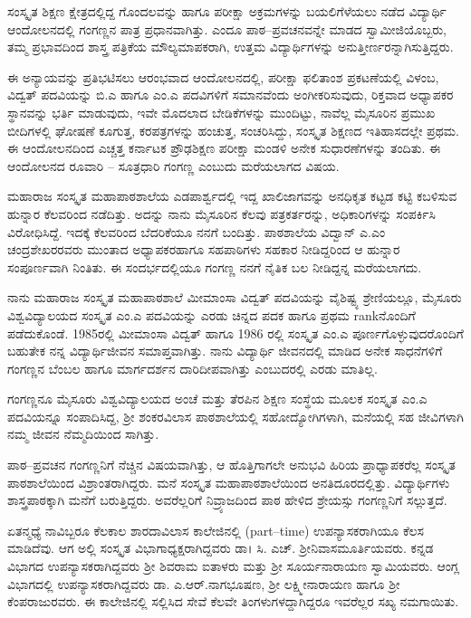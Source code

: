 ಸಂಸ್ಕೃತ ಶಿಕ್ಷಣ ಕ್ಷೇತ್ರದಲ್ಲಿದ್ದ ಗೊಂದಲವನ್ನು ಹಾಗೂ ಪರೀಕ್ಷಾ ಅಕ್ರಮಗಳನ್ನು ಬಯಲಿಗೆಳೆಯಲು ನಡೆದ ವಿದ್ಯಾರ್ಥಿ ಆಂದೋಲನದಲ್ಲಿ ಗಂಗಣ್ಣನ ಪಾತ್ರ ಪ್ರಧಾನವಾಗಿತ್ತು. ಎಂದೂ ಪಾಠ–ಪ್ರವಚನವನ್ನೇ ಮಾಡದ ಸ್ವಾಮೀಜಿಯೊಬ್ಬರು, ತಮ್ಮ  ಪ್ರಭಾವದಿಂದ ಶಾಸ್ತ್ರ ಪತ್ರಿಕೆಯ ಮೌಲ್ಯಮಾಪಕರಾಗಿ, ಉತ್ತಮ ವಿದ್ಯಾರ್ಥಿಗಳನ್ನು ಅನುತ್ತೀರ್ಣರನ್ನಾಗಿಸುತ್ತಿದ್ದರು. 

ಈ ಅನ್ಯಾಯವನ್ನು ಪ್ರತಿಭಟಿಸಲು ಆರಂಭವಾದ ಆಂದೋಲನದಲ್ಲಿ, ಪರೀಕ್ಷಾ ಫಲಿತಾಂಶ ಪ್ರಕಟಣೆಯಲ್ಲಿ ವಿಳಂಬ, ವಿದ್ವತ್ ಪದವಿಯನ್ನು ಬಿ.ಎ  ಹಾಗೂ  ಎಂ.ಎ ಪದವಿಗಳಿಗೆ ಸಮಾನವೆಂದು ಅಂಗೀಕರಿಸುವುದು, ರಿಕ್ತವಾದ ಅಧ್ಯಾಪಕರ ಸ್ಥಾನವನ್ನು  ಭರ್ತಿ ಮಾಡುವುದು, ಇವೇ ಮೊದಲಾದ ಬೇಡಿಕೆಗಳನ್ನು ಮುಂದಿಟ್ಟು, ನಾವೆಲ್ಲ ಮೈಸೂರಿನ ಪ್ರಮುಖ ಬೀದಿಗಳಲ್ಲಿ ಘೋಷಣೆ ಕೂಗುತ್ತ, ಕರಪತ್ರಗಳನ್ನು ಹಂಚುತ್ತ, ಸಂಚರಿಸಿದ್ದು, ಸಂಸ್ಕೃತ ಶಿಕ್ಷಣದ ಇತಿಹಾಸದಲ್ಲೇ ಪ್ರಥಮ. ಈ ಆಂದೋಲನದಿಂದ ಎಚ್ಚತ್ತ ಕರ್ನಾಟಕ ಪ್ರೌಢಶಿಕ್ಷಣ ಪರೀಕ್ಷಾ ಮಂಡಳಿ ಅನೇಕ ಸುಧಾರಣೆಗಳನ್ನು ತಂದಿತು. ಈ ಆಂದೋಲನದ ರೂವಾರಿ – ಸೂತ್ರಧಾರಿ ಗಂಗಣ್ಣ  ಎಂಬುದು ಮರೆಯಲಾಗದ ವಿಷಯ.

ಮಹಾರಾಜ ಸಂಸ್ಕೃತ ಮಹಾಪಾಠಶಾಲೆಯ ಎಡಪಾರ್ಶ್ವದಲ್ಲಿ ಇದ್ದ ಖಾಲಿಜಾಗವನ್ನು ಅನಧಿಕೃತ ಕಟ್ಟಡ ಕಟ್ಟಿ ಕಬಳಿಸುವ ಹುನ್ನಾರ ಕೆಲವರಿಂದ ನಡೆದಿತ್ತು. ಅದನ್ನು ನಾನು ಮೈಸೂರಿನ ಕೆಲವು  ಪತ್ರಕರ್ತರನ್ನು, ಅಧಿಕಾರಿಗಳನ್ನು ಸಂಪರ್ಕಿಸಿ ವಿರೋಧಿಸಿದ್ದೆ. ಇದಕ್ಕೆ ಕೆಲವರಿಂದ ಬೆದರಿಕೆಯೂ ನನಗೆ ಬಂದಿತ್ತು. ಪಾಠಶಾಲೆಯ ವಿದ್ವಾನ್ ಎ.ಎಂ ಚಂದ್ರಶೇಖರರವರು ಮುಂತಾದ ಅಧ್ಯಾಪಕರಹಾಗೂ ಸಹಪಾಠಿಗಳು ಸಹಕಾರ ನೀಡಿದ್ದರಿಂದ ಆ ಹುನ್ನಾರ ಸಂಪೂರ್ಣವಾಗಿ ನಿಂತಿತು. ಈ ಸಂದರ್ಭದಲ್ಲಿಯೂ ಗಂಗಣ್ಣ ನನಗೆ ನೈತಿಕ ಬಲ ನೀಡಿದ್ದನ್ನ ಮರೆಯಲಾಗದು.

ನಾನು ಮಹಾರಾಜ ಸಂಸ್ಕೃತ ಮಹಾಪಾಠಶಾಲೆ ಮೀಮಾಂಸಾ ವಿದ್ವತ್ ಪದವಿಯನ್ನು ವೈಶಿಷ್ಟ್ಯ ಶ್ರೇಣಿಯಲ್ಲೂ, ಮೈಸೂರು  ವಿಶ್ವವಿದ್ಯಾಲಯದ ಸಂಸ್ಕೃತ  ಎಂ.ಎ ಪದವಿಯನ್ನು ಎರಡು ಚಿನ್ನದ ಪದಕ ಹಾಗೂ ಪ್ರಥಮ  rankನೊಂದಿಗೆ ಪಡೆದುಕೊಂಡೆ. 1985ರಲ್ಲಿ ಮೀಮಾಂಸಾ ವಿದ್ವತ್ ಹಾಗೂ 1986 ರಲ್ಲಿ ಸಂಸ್ಕೃತ ಎಂ.ಎ ಪೂರ್ಣಗೊಳ್ಳುವುದರೊಂದಿಗೆ ಬಹುತೇಕ ನನ್ನ ವಿದ್ಯಾರ್ಥಿಜೀವನ ಸಮಾಪ್ತವಾಗಿತ್ತು. ನಾನು ವಿದ್ಯಾರ್ಥಿ ಜೀವನದಲ್ಲಿ ಮಾಡಿದ ಅನೇಕ ಸಾಧನೆಗಳಿಗೆ ಗಂಗಣ್ಣನ ಬೆಂಬಲ ಹಾಗೂ ಮಾರ್ಗದರ್ಶನ ದಾರಿದೀಪವಾಗಿತ್ತು ಎಂಬುದರಲ್ಲಿ ಎರಡು ಮಾತಿಲ್ಲ.

ಗಂಗಣ್ಣನೂ ಮೈಸೂರು ವಿಶ್ವವಿದ್ಯಾಲಯದ ಅಂಚೆ ಮತ್ತು ತೆರಪಿನ ಶಿಕ್ಷಣ ಸಂಸ್ಥೆಯ ಮೂಲಕ ಸಂಸ್ಕೃತ ಎಂ.ಎ ಪದವಿಯನ್ನೂ ಸಂಪಾದಿಸಿದ್ದ, ಶ್ರೀ ಶಂಕರವಿಲಾಸ ಪಾಠಶಾಲೆಯಲ್ಲಿ ಸಹೋದ್ಯೋಗಿಗಳಾಗಿ, ಮನೆಯಲ್ಲಿ ಸಹ ಜೀವಿಗಳಾಗಿ ನಮ್ಮ ಜೀವನ ನೆಮ್ಮದಿಯಿಂದ ಸಾಗಿತ್ತು.

ಪಾಠ–ಪ್ರವಚನ ಗಂಗಣ್ಣನಿಗೆ ನೆಚ್ಚಿನ ವಿಷಯವಾಗಿತ್ತು, ಆ ಹೊತ್ತಿಗಾಗಲೇ ಅನುಭವಿ  ಹಿರಿಯ ಪ್ರಾಧ್ಯಾಪಕರೆಲ್ಲ ಸಂಸ್ಕೃತ  ಪಾಠಶಾಲೆಯಿಂದ ವಿಶ್ರಾಂತರಾಗಿದ್ದರು. ಮನೆ ಸಂಸ್ಕೃತ ಮಹಾಪಾಠಶಾಲೆಯಿಂದ ಅನತಿದೂರದಲ್ಲಿತ್ತು. ವಿದ್ಯಾರ್ಥಿಗಳು ಶಾಸ್ತ್ರಪಾಠಕ್ಕಾಗಿ ಮನೆಗೆ ಬರುತ್ತಿದ್ದರು. ಅವರೆಲ್ಲರಿಗೆ ನಿವ್ರ್ಯಾಜದಿಂದ ಪಾಠ ಹೇಳಿದ ಶ್ರೇಯಸ್ಸು ಗಂಗಣ್ಣನಿಗೆ ಸಲ್ಲುತ್ತದೆ.

ಏತನ್ಮಧ್ಯೆ ನಾವಿಬ್ಬರೂ ಕೆಲಕಾಲ ಶಾರದಾವಿಲಾಸ ಕಾಲೇಜಿನಲ್ಲಿ (part–time) ಉಪನ್ಯಾಸಕರಾಗಿಯೂ ಕೆಲಸ ಮಾಡಿದೆವು. ಆಗ ಅಲ್ಲಿ ಸಂಸ್ಕೃತ ವಿಭಾಗಾಧ್ಯಕ್ಷರಾಗಿದ್ದವರು ಡಾ। ಸಿ. ಎಚ್. ಶ್ರೀನಿವಾಸಮೂರ್ತಿಯವರು. ಕನ್ನಡ ವಿಭಾಗದ ಉಪನ್ಯಾಸಕರಾಗಿದ್ದವರು ಶ್ರೀ ಶಿವರಾಮ ಐತಾಳರು ಮತ್ತು ಶ್ರೀ ಸೂರ್ಯನಾರಾಯಣ ಸ್ವಾಮಿಯವರು. ಆಂಗ್ಲ ವಿಭಾಗದಲ್ಲಿ ಉಪನ್ಯಾಸಕರಾಗಿದ್ದವರು ಡಾ. ಎ.ಆರ್.ನಾಗಭೂಷಣ, ಶ್ರೀ ಲಕ್ಷ್ಮೀನಾರಾಯಣ ಹಾಗೂ ಶ್ರೀ ಕೆಂಪರಾಜುರವರು. ಈ ಕಾಲೇಜಿನಲ್ಲಿ ಸಲ್ಲಿಸಿದ ಸೇವೆ ಕೆಲವೇ ತಿಂಗಳುಗಳದ್ದಾಗಿದ್ದರೂ ಇವರೆಲ್ಲರ ಸಖ್ಯ ನಮಗಾಯಿತು. 

